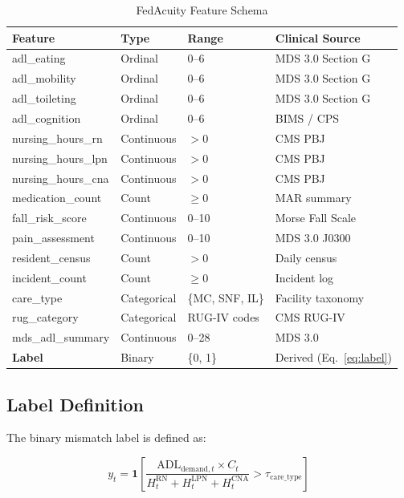 \documentclass[journal]{IEEEtran}
\begin{document}
\begin{table}[!t]
\caption{FedAcuity Feature Schema}
\label{tab:schema}
\centering
\begin{tabular}{@{}llll@{}}
\toprule
\textbf{Feature} & \textbf{Type} & \textbf{Range} & \textbf{Clinical Source} \\
\midrule
adl\_eating       & Ordinal & 0--6   & MDS 3.0 Section G \\
adl\_mobility     & Ordinal & 0--6   & MDS 3.0 Section G \\
adl\_toileting    & Ordinal & 0--6   & MDS 3.0 Section G \\
adl\_cognition    & Ordinal & 0--6   & BIMS / CPS \\
nursing\_hours\_rn  & Continuous & $>0$ & CMS PBJ \\
nursing\_hours\_lpn & Continuous & $>0$ & CMS PBJ \\
nursing\_hours\_cna & Continuous & $>0$ & CMS PBJ \\
medication\_count  & Count   & $\geq0$ & MAR summary \\
fall\_risk\_score  & Continuous & 0--10 & Morse Fall Scale \\
pain\_assessment   & Continuous & 0--10 & MDS 3.0 J0300 \\
resident\_census   & Count   & $>0$   & Daily census \\
incident\_count    & Count   & $\geq0$ & Incident log \\
care\_type        & Categorical & \{MC, SNF, IL\} & Facility taxonomy \\
rug\_category     & Categorical & RUG-IV codes & CMS RUG-IV \\
mds\_adl\_summary  & Continuous & 0--28 & MDS 3.0 \\
\midrule
\textbf{Label} & Binary & \{0, 1\} & Derived (Eq.~\ref{eq:label}) \\
\bottomrule
\end{tabular}
\end{table}

\subsection{Label Definition}
The binary mismatch label is defined as:

\begin{equation}
y_t = \mathbf{1}\!\left[\frac{\text{ADL}_{\text{demand},t} \times C_t}
      {H_t^{\text{RN}} + H_t^{\text{LPN}} + H_t^{\text{CNA}}}
      > \tau_{\text{care\_type}}\right]
\label{eq:label}
\end{equation}
\end{document}
